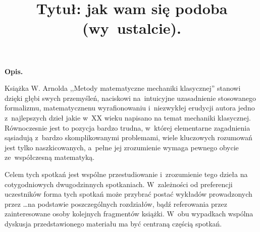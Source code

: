\documentclass[a4paper,11pt]{article}
\title{Tytuł: jak wam się podoba (wy~ustalcie).}
\author{}
\date{}
\begin{document}
\maketitle

\begin{center}
\Large{\textbf{Opis.}}
\end{center}

Książka W. Arnolda ,,Metody matematyczne mechaniki klasycznej'' stanowi dzięki głębi swych przemyśleń, naciskowi na~intuicyjne uzasadnienie stosowanego formalizmu, matematycznenu wyrafionowaniu i~niezwykłej erudycji autora jedno z~najlepszych dzieł jakie w~XX wieku napisano na temat mechaniki klasycznej. Równoczesnie jest to pozycja bardzo trudna, w~której elementarne zagadnienia sąsiadują z~bardzo skomplikowanymi problemami, wiele kluczowych rozumowań jest tylko naszkicowanych, a~pełne jej zrozumienie wymaga pewnego obycie ze~współczesną matematyką.

Celem tych spotkań jest wspólne przestudiowanie i~zrozumienie tego dzieła na cotygodniowych dwugodzinnych spotkaniach. W~zależności od preferencji uczestników forma tych spotkań może przybrać postać wykładów prowadzonych przez \ldots na podstawie poszczególnych rozdziałów, bądź referowania przez zainteresowane osoby kolejnych fragmentów książki. W~obu wypadkach wspólna dyskusja przedstawionego materiału ma być centraną częścią spotkań.
\end{document}
